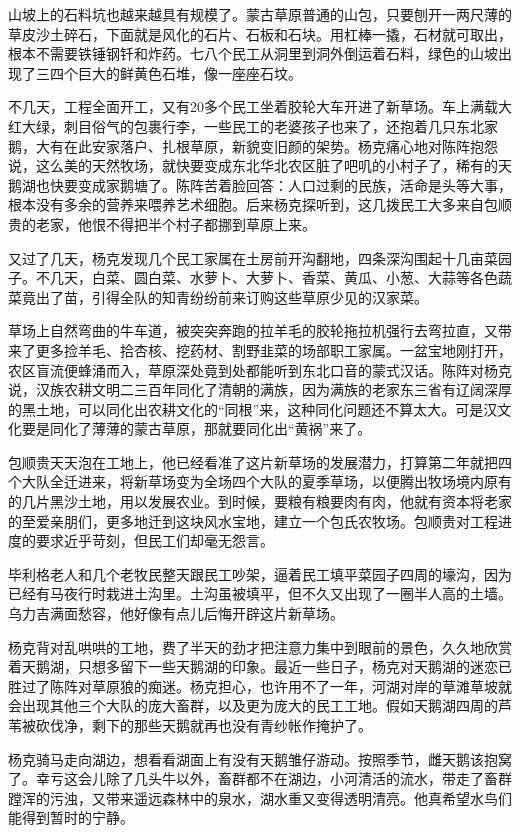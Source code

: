 \par 山坡上的石料坑也越来越具有规模了。蒙古草原普通的山包，只要刨开一两尺薄的草皮沙土碎石，下面就是风化的石片、石板和石块。用杠棒一撬，石材就可取出，根本不需要铁锤钢钎和炸药。七八个民工从洞里到洞外倒运着石料，绿色的山坡出现了三四个巨大的鲜黄色石堆，像一座座石坟。
\par 不几天，工程全面开工，又有20多个民工坐着胶轮大车开进了新草场。车上满载大红大绿，刺目俗气的包裹行李，一些民工的老婆孩子也来了，还抱着几只东北家鹅，大有在此安家落户、扎根草原，新貌变旧颜的架势。杨克痛心地对陈阵抱怨说，这么美的天然牧场，就快要变成东北华北农区脏了吧叽的小村子了，稀有的天鹅湖也快要变成家鹅塘了。陈阵苦着脸回答：人口过剩的民族，活命是头等大事，根本没有多余的营养来喂养艺术细胞。后来杨克探听到，这几拨民工大多来自包顺贵的老家，他恨不得把半个村子都挪到草原上来。
\par 又过了几天，杨克发现几个民工家属在土房前开沟翻地，四条深沟围起十几亩菜园子。不几天，白菜、圆白菜、水萝卜、大萝卜、香菜、黄瓜、小葱、大蒜等各色蔬菜竟出了苗，引得全队的知青纷纷前来订购这些草原少见的汉家菜。
\par 草场上自然弯曲的牛车道，被突突奔跑的拉羊毛的胶轮拖拉机强行去弯拉直，又带来了更多捡羊毛、拾杏核、挖药材、割野韭菜的场部职工家属。一盆宝地刚打开，农区盲流便蜂涌而入，草原深处竟到处都能听到东北口音的蒙式汉话。陈阵对杨克说，汉族农耕文明二三百年同化了清朝的满族，因为满族的老家东三省有辽阔深厚的黑土地，可以同化出农耕文化的“同根”来，这种同化问题还不算太大。可是汉文化要是同化了薄薄的蒙古草原，那就要同化出“黄祸”来了。
\par 包顺贵天天泡在工地上，他已经看准了这片新草场的发展潜力，打算第二年就把四个大队全迁进来，将新草场变为全场四个大队的夏季草场，以便腾出牧场境内原有的几片黑沙土地，用以发展农业。到时候，要粮有粮要肉有肉，他就有资本将老家的至爱亲朋们，更多地迁到这块风水宝地，建立一个包氏农牧场。包顺贵对工程进度的要求近乎苛刻，但民工们却毫无怨言。
\par 毕利格老人和几个老牧民整天跟民工吵架，逼着民工填平菜园子四周的壕沟，因为已经有马夜行时栽进土沟里。土沟虽被填平，但不久又出现了一圈半人高的土墙。乌力吉满面愁容，他好像有点儿后悔开辟这片新草场。
\par 
\par 杨克背对乱哄哄的工地，费了半天的劲才把注意力集中到眼前的景色，久久地欣赏着天鹅湖，只想多留下一些天鹅湖的印象。最近一些日子，杨克对天鹅湖的迷恋已胜过了陈阵对草原狼的痴迷。杨克担心，也许用不了一年，河湖对岸的草滩草坡就会出现其他三个大队的庞大畜群，以及更为庞大的民工工地。假如天鹅湖四周的芦苇被砍伐净，剩下的那些天鹅就再也没有青纱帐作掩护了。
\par 杨克骑马走向湖边，想看看湖面上有没有天鹅雏仔游动。按照季节，雌天鹅该抱窝了。幸亏这会儿除了几头牛以外，畜群都不在湖边，小河清活的流水，带走了畜群蹚浑的污浊，又带来遥远森林中的泉水，湖水重又变得透明清亮。他真希望水鸟们能得到暂时的宁静。
